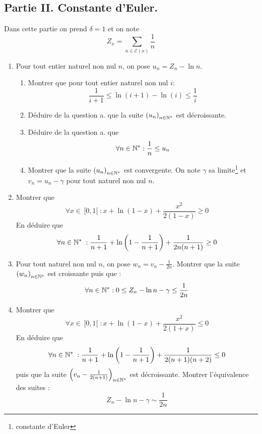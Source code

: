 \subsection*{Partie II. Constante d'Euler.}
Dans cette partie on prend $\delta=1$ et on note 
\begin{displaymath}
Z_x=\sum_{n\in \mathcal E(x)}\frac{1}{n} 
\end{displaymath}
\begin{enumerate}
 \item Pour tout entier naturel non nul $n$, on pose $u_n=Z_n-\ln n$.
\begin{enumerate}
 \item Montrer que pour tout entier naturel non nul $i$:
\begin{displaymath}
 \frac{1}{i+1}\leq \ln(i+1) - \ln(i)\leq \frac{1}{i}
\end{displaymath}
\item Déduire de la question a. que la suite $\left(u_n \right)_{n\in\mathbb{N}^*}$ est décroissante.
\item Déduire de la question a. que 
\begin{displaymath}
 \forall n\in \mathbb{N}^* : \frac{1}{n}\leq u_n
\end{displaymath}
\item Montrer que la suite  $\left(u_n \right)_{n\in\mathbb{N}^*}$ est convergente. On note $\gamma$ sa limite\footnote{constante d'Euler} et $v_n=u_n-\gamma$ pour tout naturel non nul $n$.
\end{enumerate}
\item
  Montrer que 
\begin{displaymath}
 \forall x\in \,[0,1[ \;: x+\ln(1-x)+\frac{x^2}{2(1-x)}\geq 0
\end{displaymath}
En déduire que
\begin{displaymath}
 \forall n\in \mathbb{N}^* \;: \frac{1}{n+1}+\ln\left(1-\frac{1}{n+1}\right)+\frac{1}{2n(n+1)}\geq 0 
\end{displaymath}
\item Pour tout naturel non nul $n$, on pose $w_n=v_n-\frac{1}{2n}$. Montrer que la suite $\left(w_n \right)_{n\in\mathbb{N}^*}$ est croissante puis que :
\begin{displaymath}
 \forall n\in \mathbb{N}^* : 0\leq Z_n - \ln n -\gamma \leq \frac{1}{2n}
\end{displaymath}
\item   Montrer que 
\begin{displaymath}
 \forall x\in \,[0,1[ \;: x+\ln(1-x)+\frac{x^2}{2(1+x)}\leq 0
\end{displaymath}
En déduire que
\begin{displaymath}
 \forall n\in \mathbb{N}^* \;: \frac{1}{n+1}+\ln\left(1-\frac{1}{n+1}\right)+\frac{1}{2(n+1)(n+2)}\leq 0 
\end{displaymath}
puis que la suite $\left(v_n -\frac{1}{2(n+1)}\right)_{n\in\mathbb{N}^*}$ est décroissante. Montrer l'équivalence des suites :
\begin{displaymath}
 Z_n - \ln n -\gamma \sim \frac{1}{2n}
\end{displaymath}

\end{enumerate}

